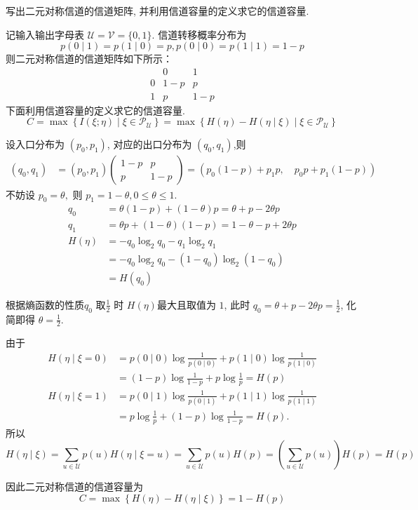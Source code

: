 \begin{tcolorbox}[breakable,colback=blue!5!white,colframe=blue!75!black,
 title= 解答题]

写出二元对称信道的信道矩阵, 并利用信道容量的定义求它的信道容量.
\tcblower

记输入输出字母表 $ \mathscr{U}=\mathscr{V}=\{0,1\} $. 信道转移概率分布为
$$
p(0 \mid 1)=p(1 \mid 0)=p, p(0 \mid 0)=p(1 \mid 1)=1-p
$$
则二元对称信道的信道矩阵如下所示：
$$
\begin{array}{ccc}
 & 0 & 1 \\
0 & 1-p & p \\
1 & p & 1-p
\end{array}
$$
下面利用信道容量的定义求它的信道容量. 
$$C=\max \left\{I(\xi ; \eta) \mid \xi \in \mathscr{P}_{\mathscr{U}}\right\}=\max \left\{H(\eta)-H(\eta \mid \xi) \mid \xi \in \mathscr{P}_{\mathscr{U}}\right\}$$

设入口分布为 $\left(p_{0}, p_{1}\right)$, 对应的出口分布为 $\left(q_{0}, q_{1}\right)$,则
$$
\begin{aligned}
\left(q_{0}, q_{1}\right) & =\left(p_{0}, p_{1}\right)\left(\begin{array}{cc}
1-p & p \\
p & 1-p
\end{array}\right) =\left(p_{0}(1-p)+p_{1}  p,\quad p_{0} p+p_{1}(1-p)\right)
\end{aligned}
$$
不妨设 $p_{0}=\theta ,$ 则 $ p_{1}=1-\theta, 0 \leqslant \theta \leqslant 1 $.
$$ \begin{aligned} q_{0} & =\theta(1-p)+(1-\theta) p=\theta+p-2 \theta p \\ q_{1} & =\theta p+(1-\theta)(1-p)=1-\theta-p+2 \theta p \\ H(\eta) & =-q_{0} \log _{2} q_{0}-q_{1} \log _{2} q_{1} \\ & =-q_{0} \log _{2} q_{0}-\left(1-q_{0}\right) \log _{2}\left(1-q_{0}\right) \\ & =H\left(q_{0}\right)\end{aligned} $$

 根据熵函数的性质$q_{0}$ 取$\frac 12$ 时 $H(\eta) $最大且取值为 $1$, 此时 $q_0= \theta+p-2 \theta p=\frac{1}{2} $, 化简即得 $ \theta=\frac{1}{2} $.

由于
$$
\begin{aligned}
H(\eta \mid \xi=0) & =p(0 \mid 0) \log \frac{1}{p(0 \mid 0)}+p(1 \mid 0) \log \frac{1}{p(1 \mid 0)} \\
& =(1-p) \log \frac{1}{1-p}+p \log \frac{1}{p}=H(p) \\
H(\eta \mid \xi=1) & =p(0 \mid 1) \log \frac{1}{p(0 \mid 1)}+p(1 \mid 1) \log \frac{1}{p(1 \mid 1)} \\
& =p \log \frac{1}{p}+(1-p) \log \frac{1}{1-p}=H(p) .
\end{aligned}
$$
所以
$$H(\eta \mid \xi)=\sum_{u \in \mathscr{U}} p(u) H(\eta \mid \xi=u)=\sum_{u \in \mathscr{U}} p(u) H(p)=\left(\sum_{u \in \mathscr{U}} p(u)\right) H(p)=H(p)$$

因此二元对称信道的信道容量为
$$C=\max \left\{H(\eta)-H(\eta \mid \xi) \right\}=1-H(p)$$

\end{tcolorbox}



